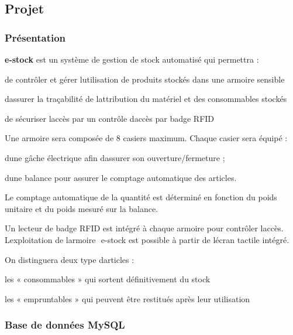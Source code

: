 \hypertarget{page__r_e_a_d_m_e_projet}{}\subsection{Projet}\label{page__r_e_a_d_m_e_projet}
\hypertarget{page__r_e_a_d_m_e_presentation}{}\subsubsection{Présentation}\label{page__r_e_a_d_m_e_presentation}
{\bfseries e-\/stock} est un système de gestion de stock automatisé qui permettra \+:


\begin{DoxyItemize}
\item de contrôler et gérer l\textquotesingle{}utilisation de produits stockés dans une armoire sensible
\item d\textquotesingle{}assurer la traçabilité de l\textquotesingle{}attribution du matériel et des consommables stockés
\item de sécuriser l\textquotesingle{}accès par un contrôle d\textquotesingle{}accès par badge R\+F\+ID
\end{DoxyItemize}

Une armoire sera composée de 8 casiers maximum. Chaque casier sera équipé \+:


\begin{DoxyItemize}
\item d\textquotesingle{}une gâche électrique afin d\textquotesingle{}assurer son ouverture/fermeture ;
\item d\textquotesingle{}une balance pour assurer le comptage automatique des articles.
\end{DoxyItemize}

Le comptage automatique de la quantité est déterminé en fonction du poids unitaire et du poids mesuré sur la balance.

Un lecteur de badge R\+F\+ID est intégré à chaque armoire pour contrôler l\textquotesingle{}accès. L\textquotesingle{}exploitation de l\textquotesingle{}armoire ​ e-\/stock​ est possible à partir de l\textquotesingle{}écran tactile intégré.

On distinguera deux type d\textquotesingle{}articles \+:


\begin{DoxyItemize}
\item les « consommables » qui sortent définitivement du stock
\item les « empruntables » qui peuvent être restitués après leur utilisation
\end{DoxyItemize}\hypertarget{page__r_e_a_d_m_e_bdd}{}\subsubsection{Base de données My\+S\+QL}\label{page__r_e_a_d_m_e_bdd}



